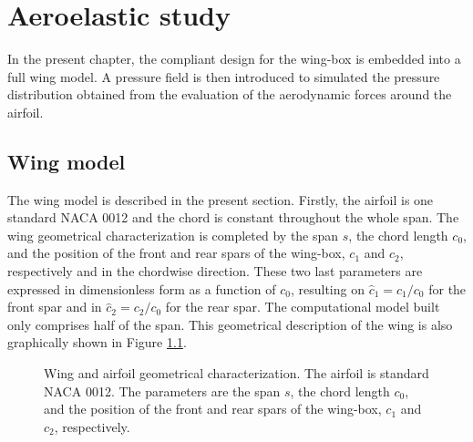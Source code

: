 \chapter{Aeroelastic study} \label{chap:aeroelastic}

  In the present chapter, the compliant design for the wing-box is embedded into a full wing model. A pressure field is then introduced to simulated the pressure distribution obtained from the evaluation of the aerodynamic forces around the airfoil.

  \section{Wing model} \label{sec:wingModel_aeroelastic}

    The wing model is described in the present section. Firstly, the airfoil is one standard NACA 0012 and the chord is constant throughout the whole span. The wing geometrical characterization is completed by the span $s$, the chord length $c_0$, and the position of the front and rear spars of the wing-box, $c_1$ and $c_2$, respectively and in the chordwise direction. These two last parameters are expressed in dimensionless form as a function of $c_0$, resulting on $\hat{c}_1 = c_1 /c_0$ for the front spar and in $\hat{c}_2 = c_2 /c_0$ for the rear spar. The computational model built only comprises half of the span. This geometrical description of the wing is also graphically shown in Figure \ref{fig:wing-dim}. 

    \begin{figure}[!htpb]
      \centering
       \qquad
      \caption[Wing geometrical characterization]{Wing and airfoil geometrical characterization. The airfoil is standard NACA 0012. The parameters are the span $s$, the chord length $c_0$, and the position of the front and rear spars of the wing-box, $c_1$ and $c_2$, respectively.}
      \label{fig:wing-dim}
    \end{figure}

